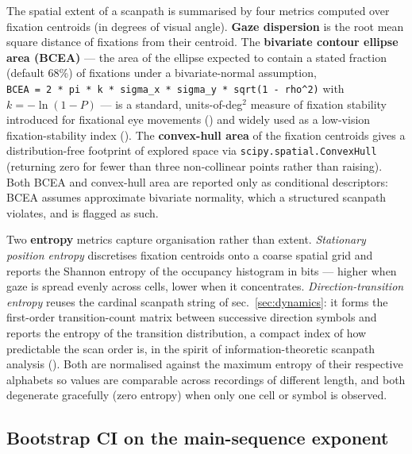 \documentclass[
]{article}
\begin{document}
The spatial extent of a scanpath is summarised by four metrics computed
over fixation centroids (in degrees of visual angle). \textbf{Gaze
dispersion} is the root mean square distance of fixations from their
centroid. The \textbf{bivariate contour ellipse area (BCEA)} --- the
area of the ellipse expected to contain a stated fraction (default 68\%)
of fixations under a bivariate-normal assumption,
\texttt{BCEA\ =\ 2\ *\ pi\ *\ k\ *\ sigma\_x\ *\ sigma\_y\ *\ sqrt(1\ -\ rho\^{}2)}
with \(k = -\ln(1-P)\) --- is a standard, units-of-deg\(^2\) measure of
fixation stability introduced for fixational eye movements
() and widely used as a
low-vision fixation-stability index
(). The
\textbf{convex-hull area} of the fixation centroids gives a
distribution-free footprint of explored space via
\texttt{scipy.spatial.ConvexHull} (returning zero for fewer than three
non-collinear points rather than raising). Both BCEA and convex-hull
area are reported only as conditional descriptors: BCEA assumes
approximate bivariate normality, which a structured scanpath violates,
and is flagged as such.

Two \textbf{entropy} metrics capture organisation rather than extent.
\emph{Stationary position entropy} discretises fixation centroids onto a
coarse spatial grid and reports the Shannon entropy of the occupancy
histogram in bits --- higher when gaze is spread evenly across cells,
lower when it concentrates. \emph{Direction-transition entropy} reuses
the cardinal scanpath string of sec.~\ref{sec:dynamics}: it forms the
first-order transition-count matrix between successive direction symbols
and reports the entropy of the transition distribution, a compact index
of how predictable the scan order is, in the spirit of
information-theoretic scanpath analysis
(). Both
are normalised against the maximum entropy of their respective alphabets
so values are comparable across recordings of different length, and both
degenerate gracefully (zero entropy) when only one cell or symbol is
observed.

\subsection{Bootstrap CI on the main-sequence
exponent}\label{bootstrap-ci-on-the-main-sequence-exponent}
\end{document}
